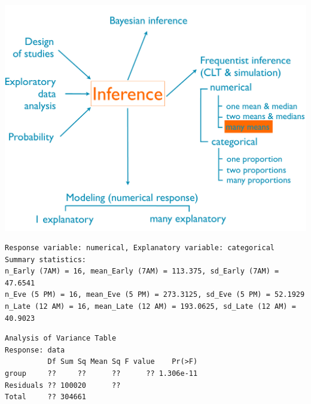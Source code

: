 \documentclass[slidestop,compress,mathserif,12pt,t,professionalfonts,xcolor=table]{beamer}
\begin{document}

\begin{frame}[fragile]

{
{\scriptsize
{}}
}
{
 \includegraphics[width=\textwidth]{figures/map/many_mean}
}

{\scriptsize
\begin{verbatim}
Response variable: numerical, Explanatory variable: categorical
Summary statistics:
n_Early (7AM) = 16, mean_Early (7AM) = 113.375, sd_Early (7AM) = 47.6541
n_Eve (5 PM) = 16, mean_Eve (5 PM) = 273.3125, sd_Eve (5 PM) = 52.1929
n_Late (12 AM) = 16, mean_Late (12 AM) = 193.0625, sd_Late (12 AM) = 40.9023
\end{verbatim}
}

{\small
\begin{verbatim}
Analysis of Variance Table
Response: data
          Df Sum Sq Mean Sq F value    Pr(>F)
group     ??     ??      ??      ?? 1.306e-11
Residuals ?? 100020      ??        
Total     ?? 304661  
\end{verbatim}
}

\end{frame}

\end{document}
